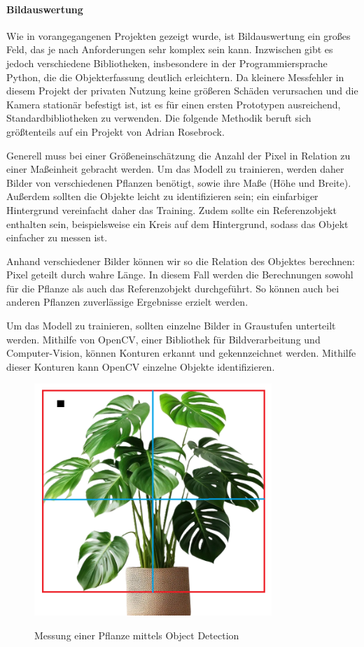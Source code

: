\paragraph{Bildauswertung}
Wie in vorangegangenen Projekten gezeigt wurde, ist Bildauswertung ein großes Feld, das je nach Anforderungen sehr komplex sein kann. Inzwischen gibt es jedoch verschiedene Bibliotheken, insbesondere in der Programmiersprache Python, die die Objekterfassung deutlich erleichtern. Da kleinere Messfehler in diesem Projekt der privaten Nutzung keine größeren Schäden verursachen und die Kamera stationär befestigt ist, ist es für einen ersten Prototypen ausreichend, Standardbibliotheken zu verwenden. Die folgende Methodik beruft sich größtenteils auf ein Projekt von Adrian Rosebrock.\cite{pyimagesearch2024measuring}

Generell muss bei einer Größeneinschätzung die Anzahl der Pixel in Relation zu einer Maßeinheit gebracht werden. Um das Modell zu trainieren, werden daher Bilder von verschiedenen Pflanzen benötigt, sowie ihre Maße (Höhe und Breite). Außerdem sollten die Objekte leicht zu identifizieren sein; ein einfarbiger Hintergrund vereinfacht daher das Training. Zudem sollte ein Referenzobjekt enthalten sein, beispielsweise ein Kreis auf dem Hintergrund, sodass das Objekt einfacher zu messen ist.

Anhand verschiedener Bilder können wir so die Relation des Objektes berechnen: Pixel geteilt durch wahre Länge. In diesem Fall werden die Berechnungen sowohl für die Pflanze als auch das Referenzobjekt durchgeführt. So können auch bei anderen Pflanzen zuverlässige Ergebnisse erzielt werden.

Um das Modell zu trainieren, sollten einzelne Bilder in Graustufen unterteilt werden. Mithilfe von OpenCV, einer Bibliothek für Bildverarbeitung und Computer-Vision, können Konturen erkannt und gekennzeichnet werden. Mithilfe dieser Konturen kann OpenCV einzelne Objekte identifizieren.\cite{opencv2023objectdetection}

\begin{figure}[H]
\centering
\includegraphics[width=0.8\textwidth]{images/massePlant.png}
\caption{Messung einer Pflanze mittels Object Detection}\cite{rainpoint_smart_timer}
\label{fig:rainpointDiagram}
\end{figure}

